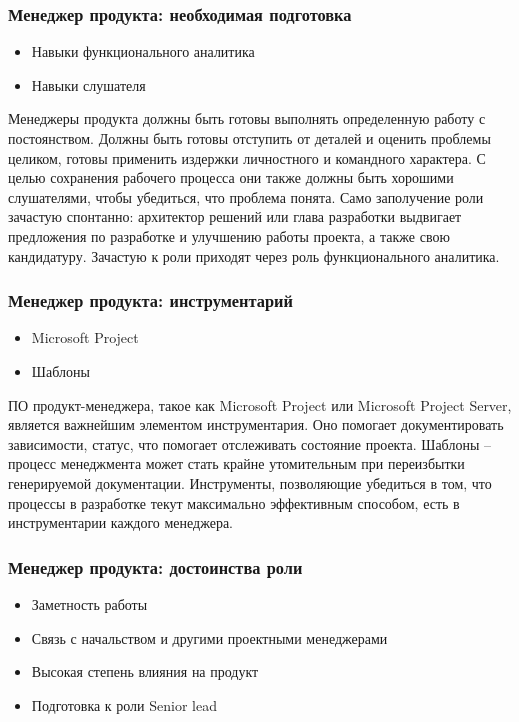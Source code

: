\documentclass{../industrial-development}
\begin{document}
\begin{frame} \frametitle{Менеджер продукта: необходимая подготовка}
  \begin{itemize}
  \item Навыки функционального аналитика
  \item Навыки слушателя
  \end{itemize}
\end{frame}

\lecturenotes

Менеджеры продукта должны быть готовы выполнять определенную работу с постоянством. Должны быть готовы отступить от деталей и оценить проблемы целиком, готовы применить издержки личностного и командного характера. 
С целью сохранения рабочего процесса они также должны быть хорошими слушателями, чтобы убедиться, что проблема понята. 
Само заполучение роли зачастую спонтанно: архитектор решений или глава разработки выдвигает предложения по разработке и улучшению работы проекта, а также свою кандидатуру. Зачастую к роли приходят через роль функционального аналитика. 
  ~\cite{Anatomy}

\begin{frame} \frametitle{Менеджер продукта: инструментарий}
  \begin{itemize}
  \item Microsoft Project
  \item Шаблоны
  \end{itemize}
\end{frame}

\lecturenotes

ПО продукт-менеджера, такое как Microsoft Project или Microsoft Project Server, является важнейшим элементом инструментария. Оно помогает документировать зависимости, статус, что помогает отслеживать состояние проекта. 
Шаблоны – процесс менеджмента может стать крайне утомительным при переизбытки генерируемой документации. Инструменты, позволяющие убедиться в том, что процессы в разработке текут максимально эффективным способом, есть в инструментарии каждого менеджера. 
  ~\cite{Anatomy}

\begin{frame} \frametitle{Менеджер продукта: достоинства роли}
  \begin{itemize}
  \item Заметность работы
  \item Связь с начальством и другими проектными менеджерами
  \item Высокая степень влияния на продукт
  \item Подготовка к роли Senior lead
  \end{itemize}
\end{frame}
\end{document}
